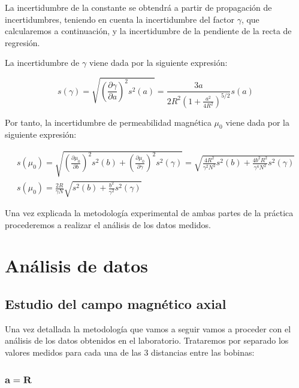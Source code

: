 \documentclass[a4paper,12pt,titlepage]{report}
\begin{document}
La incertidumbre de la constante se obtendrá a partir de propagación de incertidumbres, teniendo en cuenta la incertidumbre del factor $\gamma$, que calcularemos a continuación, y la incertidumbre de la pendiente de la recta de regresión.

\par La incertidumbre de $\gamma$ viene dada por la siguiente expresión:

\begin{equation}
    s(\gamma) = \sqrt{\left (\frac{\partial \gamma}{\partial a}\right )^2 s^2(a)} = \frac{3a}{2R^2 \left (1+ \frac{a^2}{4R^2} \right )^{5/2}} s(a)
\end{equation}

Por tanto, la incertidumbre de permeabilidad magnética $\mu_0$ viene dada por la siguiente expresión:

\begin{equation}
    \begin{gathered}
    s(\mu_0) = \sqrt{\left (\frac{\partial \mu_0 }{\partial b} \right )^2s^2(b) + \left (\frac{\partial \mu_0}{\partial \gamma} \right )^2s^2(\gamma)} = \sqrt{\frac{4R^2}{\gamma^2 N^2} s^2(b) + \frac{4b^2R^2}{\gamma^4 N^2} s^2(\gamma)} \\
    s(\mu_0) = \frac{2R}{\gamma N} \sqrt{s^2(b) + \frac{b^2}{\gamma ^2}s^2(\gamma)}
    \end{gathered}
    \label{Incertidumbre permeabilidad}
\end{equation}

Una vez explicada la metodología experimental de ambas partes de la práctica procederemos a realizar el análisis de los datos medidos.

\newpage

\section{Análisis de datos}

\subsection{Estudio del campo magnético axial}

Una vez detallada la metodología que vamos a seguir vamos a proceder con el análisis de los datos obtenidos en el laboratorio. Trataremos por separado los valores medidos para cada una de las 3 distancias entre las bobinas:

\subsubsection{$\mathbf{a=R}$}
\end{document}
